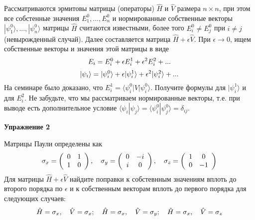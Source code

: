 \documentclass[a4paper,12pt]{article}
\begin{document}
\noindent Рассматриваются эрмитовы матрицы (операторы) $\hat{H}$ и $\hat{V}$ размера $n\times n$, при этом все собстенные значения $E_{1}^{0},...,E_{n}^{0}$ и нормированные собственные векторы $|\psi_{1}^{0}\rangle,...,|\psi_{n}^{0}\rangle$ матрицы $\hat{H}$ считаются известными, более того $E_{i}^{0}\neq E_{j}^{0}$ при $i\neq j$ (невырожденный случай). Далее составляется матрица $\hat{H}+\epsilon\hat{V}$. При $\epsilon\rightarrow 0$, ищем собственные векторы и значения этой матрицы в виде
\begin{equation}\notag
E_{i}	=E_{i}^{0}+\epsilon E_{i}^{1}+\epsilon^{2}E_{i}^{2}+...
\end{equation}
\begin{equation}
\notag
|\psi_{i}\rangle	=|\psi_{i}^{0}\rangle+\epsilon|\psi_{i}^{1}\rangle+\epsilon^{2}|\psi_{i}^{2}\rangle+...
\end{equation}
\noindent На семинаре было доказано, что $E_{i}^{1}=\langle\psi_{i}^{0}|V|\psi_{i}^{0}\rangle$. Получите формулы для $|\psi_{i}^{1}\rangle$ и для $E_{i}^{2}$. Не забудьте, что мы рассматриваем нормированные векторы, т.е. при выводе есть дополнительное условие $\langle\psi_{i}|\psi_{j}\rangle=\langle\psi_{i}^{0}|\psi_{j}^{0}\rangle=\delta_{ij}$.

\vspace{15pt}
\noindent \textbf{Упражнение 2}

\noindent Матрицы Паули определены как
\begin{equation}\notag
\sigma_{x}	=\left(\begin{array}{cc}
0 & 1\\
1 & 0
\end{array}\right),\quad\sigma_{y}=\left(\begin{array}{cc}
0 & -i\\
i & 0
\end{array}\right),\quad\sigma_{z}=\left(\begin{array}{cc}
1 & 0\\
0 & -1
\end{array}\right)
\end{equation}
\noindent Для матрицы $\hat{H}+\epsilon\hat{V}$ найдите поправки к собстевнным значениям вплоть до второго порядка по $\epsilon$ и к собственным векторам вплоть до первого порядка для следующих случаев: 
\begin{equation}\notag
	\hat{H}=\sigma_{x},\quad\hat{V}=\sigma_{x};\quad\hat{H}=\sigma_{x},\quad\hat{V}=\sigma_{y};\quad\hat{H}=\sigma_{x},\quad\hat{V}=\sigma_{z}
\end{equation}
\end{document}
